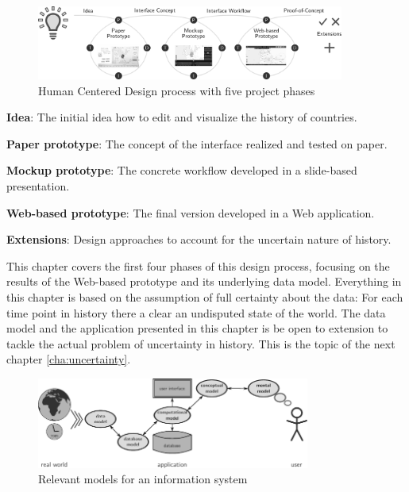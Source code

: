 \begin{figure}[H]
  \vspace{1em}
  \centering
  \includegraphics[width=0.9\textwidth]{graphics/development/human_centered_design}
  \caption{Human Centered Design process with five project phases}
  \label{fig:human_centered_design}
\end{figure}

\newpage
\begin{compactenum}
  \item \textbf{Idea}: The initial idea how to edit and visualize the history of countries.
  \item \textbf{Paper prototype}: The concept of the interface realized and tested on paper.
  \item \textbf{Mockup prototype}: The concrete workflow developed in a slide-based presentation.
  \item \textbf{Web-based prototype}: The final version developed in a Web application.
  \item \textbf{Extensions}: Design approaches to account for the uncertain nature of history.
\end{compactenum}

This chapter covers the first four phases of this design process, focusing on the results of the Web-based prototype and its underlying data model. Everything in this chapter is based on the assumption of full certainty about the data: For each time point in history there a clear an undisputed state of the world. The data model and the application presented in this chapter is be open to extension to tackle the actual problem of uncertainty in history. This is the topic of the next chapter \ref{cha:uncertainty}.

\begin{figure}[H]
  \vspace{1.5em}
  \centering
  \includegraphics[width=0.8\textwidth]{graphics/development/models}
  \caption{Relevant models for an information system}
  \label{fig:models}
\end{figure}


